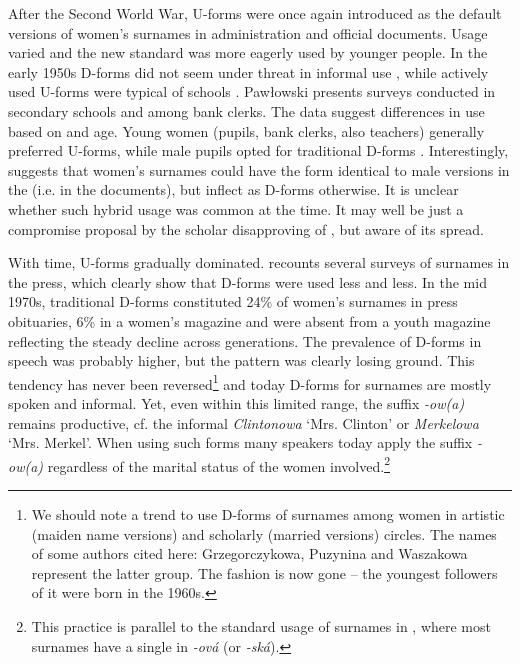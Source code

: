 \documentclass[output=paper,colorlinks,citecolor=brown]{langscibook}
\begin{document}
After the Second World War, U-forms were once again introduced as the default versions of women's surnames in administration and official documents. Usage varied and the new standard was more eagerly used by younger people. In the early 1950s D-forms did not seem under threat in informal use \citep[64]{nitsch1951}, while actively used U-forms were typical of schools \citep[49]{pawlowski1951}. Pawłowski presents surveys conducted in secondary schools and among bank clerks. The data suggest differences in use based on  and age. Young women (pupils, bank clerks, also teachers) generally preferred U-forms, while male pupils opted for traditional D-forms \citep[54--55]{pawlowski1951}. Interestingly, \citet[49]{pawlowski1951} suggests that women's surnames could have the form identical to male versions in the  (i.e. in the documents), but inflect as D-forms otherwise. It is unclear whether such hybrid usage was common at the time. It may well be just a compromise proposal by the scholar disapproving of , but aware of its spread.

With time, U-forms gradually dominated. \citet{kucala1978} recounts several surveys of surnames in the press, which clearly show that D-forms were used less and less. In the mid 1970s, traditional D-forms constituted 24\% of women's surnames in press obituaries, 6\% in a women's magazine and were absent from a youth magazine \citep[68]{kucala1978} reflecting the steady decline across generations. The prevalence of D-forms in speech was probably higher, but the pattern was clearly losing ground. This tendency has never been reversed\footnote{We should note a trend to use D-forms of surnames among women in artistic (maiden name versions) and scholarly (married versions) circles. The names of some authors cited here: Grzegorczykowa, Puzynina and Waszakowa represent the latter group. The fashion is now gone -- the youngest followers of it were born in the 1960s.} and today D-forms for surnames are mostly spoken and informal. Yet, even within this limited range, the suffix \emph{-ow(a)} remains productive, cf. the informal \emph{Clintonowa} `Mrs. Clinton' or \emph{Merkelowa} `Mrs. Merkel'. When using such forms many speakers today apply the suffix \emph{-ow(a)} regardless of the marital status of the women involved.\footnote{This practice is parallel to the standard usage of surnames in , where most surnames have a single  in \emph{-ová} (or \emph{-ská}).}
\end{document}

